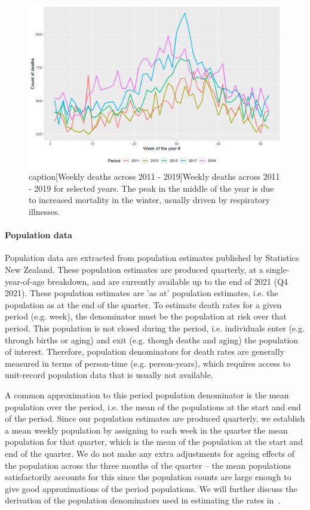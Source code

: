 \documentclass[
10pt, %
a4paper, %
oneside, %
DIV=16,
parskip=full,
headinclude,footinclude %
]{scrartcl}
\begin{document}
\begin{figure}[htb!]
\centering 
\includegraphics[width = 1.0 \columnwidth]{plots/deaths_across_years} 
caption[Weekly deaths across 2011 - 2019]{Weekly deaths across 2011 - 2019 for selected years. The peak in the middle of the year is due to increased mortality in the winter, usually driven by respiratory illnesses.} 
\label{fig:deaths_data} 
\end{figure}


\paragraph{Population data} Population data are extracted from population estimates published by Statistics New Zealand. These population estimates are produced quarterly, at a single-year-of-age breakdown, and are currently available up to the end of 2021 (Q4 2021). These population estimates are 'as at' population estimates, i.e. the population as at the end of the quarter. To estimate death rates for a given period (e.g. week), the denominator must be the population at risk over that period. This population is not closed during the period, i.e. individuals enter (e.g. through births or aging) and exit (e.g. though deaths and aging) the population of interest. Therefore, population denominators for death rates are generally measured in terms of person-time (e.g. person-years), which requires access to unit-record population data that is usually not available. 

A common approximation to this period population denominator is the mean population over the period, i.e. the mean of the populations at the start and end of the period. Since our population estimates are produced quarterly, we establish a mean weekly population by assigning to each week in the quarter the mean population for that quarter, which is the mean of the population at the start and end of the quarter. We do not make any extra adjustments for ageing effects of the population across the three months of the quarter -- the mean populations satisfactorily accounts for this since the population counts are large enough to give good approximations of the period populations. We will further discuss the derivation of the population denominators used in estimating the rates in~.
\end{document}
